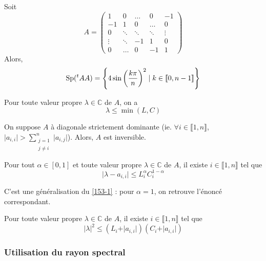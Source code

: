 	\begin{example}
		Soit
		\[
			A =
			\begin{pmatrix}
				1 & 0 & \dots & 0 & -1 \\
				-1 & 1 & 0 & \dots & 0 \\
				0 & \ddots & \ddots & \ddots & \vdots \\
				\vdots & \ddots & -1 & 1 & 0 \\
				0 & \dots & 0 & -1 & 1
			\end{pmatrix}
		\]
		Alors,
		\[ \operatorname{Sp}(\mathstrut ^t AA) = \left\{ 4 \sin \left( \frac{k \pi}{n} \right)^2 \mid k \in \llbracket 0, n-1 \rrbracket \right\} \]
	\end{example}
	
	
	\begin{corollary}
		Pour toute valeur propre $\lambda \in \mathbb{C}$ de $A$, on a
		\[ \lambda \leq \min(L,C) \]
	\end{corollary}
	
	\begin{corollary}
		On suppose $A$ à diagonale strictement dominante (ie. $\forall i \in \llbracket 1, n \rrbracket$, $\vert a_{i,i} \vert > \sum_{\substack{j=1 \\ j \neq i}}^n \vert a_{i,j} \vert$). Alors, $A$ est inversible.
	\end{corollary}
	
	\begin{theorem}[Ostrowski]
		Pour tout $\alpha \in [0,1]$ et toute valeur propre $\lambda \in \mathbb{C}$ de $A$, il existe $i \in \llbracket 1, n \rrbracket$ tel que
		\[ \vert \lambda - a_{i,i} \vert \leq L_i^{\alpha} C_i^{1-\alpha} \]
	\end{theorem}
	
	\begin{remark}
		C'est une généralisation du \cref{153-1} : pour $\alpha = 1$, on retrouve l'énoncé correspondant.
	\end{remark}
	
	\begin{corollary}
		Pour toute valeur propre $\lambda \in \mathbb{C}$ de $A$, il existe $i \in \llbracket 1, n \rrbracket$ tel que
		\[ \vert \lambda \vert^2 \leq (L_i + \vert a_{i,i} \vert) (C_i + \vert a_{i,i} \vert) \]
	\end{corollary}
	
	\subsubsection{Utilisation du rayon spectral}
	
